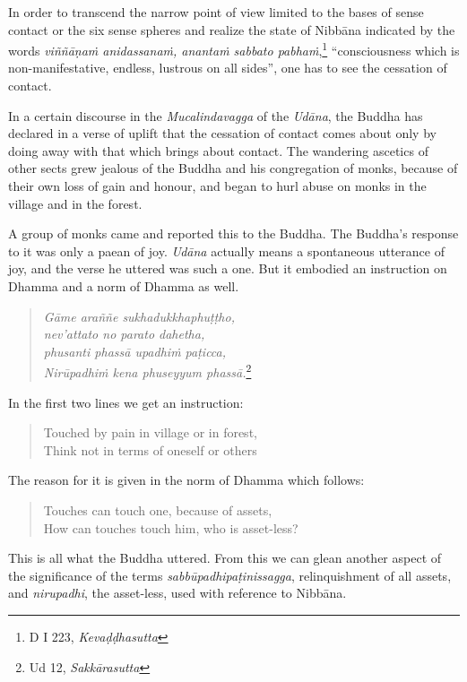 In order to transcend the narrow point of view limited to the bases of sense contact or the six sense spheres and realize the state of Nibbāna indicated by the words \emph{viññāṇaṁ anidassanaṁ, anantaṁ sabbato pabhaṁ},\footnote{D I 223, \emph{Kevaḍḍhasutta}} ``consciousness which is non-manifestative, endless, lustrous on all sides'', one has to see the cessation of contact.

In a certain discourse in the \emph{Mucalindavagga} of the \emph{Udāna}, the Buddha has declared in a verse of uplift that the cessation of contact comes about only by doing away with that which brings about contact. The wandering ascetics of other sects grew jealous of the Buddha and his congregation of monks, because of their own loss of gain and honour, and began to hurl abuse on monks in the village and in the forest.

A group of monks came and reported this to the Buddha. The Buddha's response to it was only a paean of joy. \emph{Udāna} actually means a spontaneous utterance of joy, and the verse he uttered was such a one. But it embodied an instruction on Dhamma and a norm of Dhamma as well.

\clearpage

\begin{quote}
\emph{Gāme araññe sukhadukkhaphuṭṭho,}\\
\emph{nev'attato no parato dahetha,}\\
\emph{phusanti phassā upadhiṁ paṭicca,}\\
\emph{Nirūpadhiṁ kena phuseyyum phassā.}\footnote{Ud 12, \emph{Sakkārasutta}}
\end{quote}

In the first two lines we get an instruction:

\begin{quote}
Touched by pain in village or in forest,\\
Think not in terms of oneself or others
\end{quote}

The reason for it is given in the norm of Dhamma which follows:

\begin{quote}
Touches can touch one, because of assets,\\
How can touches touch him, who is asset-less?
\end{quote}

This is all what the Buddha uttered. From this we can glean another aspect of the significance of the terms \emph{sabbūpadhipaṭinissagga}, relinquishment of all assets, and \emph{nirupadhi}, the asset-less, used with reference to Nibbāna.

